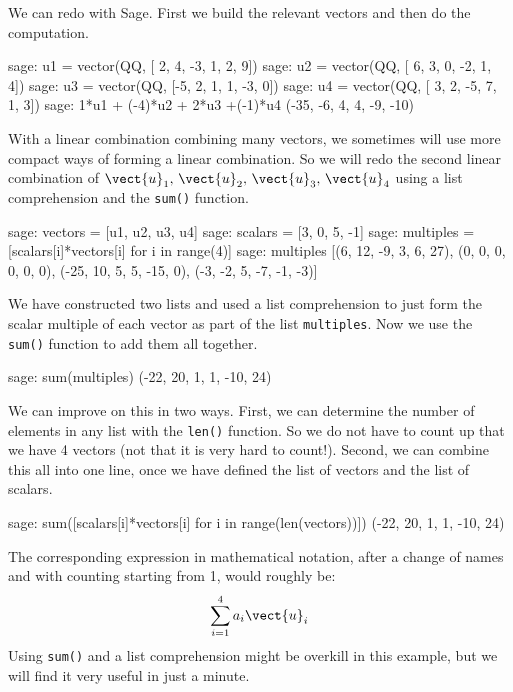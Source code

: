 We can redo  with Sage.  First we build the relevant vectors and then do the computation.
%
\begin{sageexample}
sage: u1 = vector(QQ,  [ 2, 4, -3,  1,  2, 9])
sage: u2 = vector(QQ,  [ 6, 3,  0, -2,  1, 4])
sage: u3 = vector(QQ,  [-5, 2,  1,  1, -3, 0])
sage: u4 = vector(QQ,  [ 3, 2, -5,  7,  1, 3])
sage: 1*u1 + (-4)*u2 + 2*u3 +(-1)*u4
(-35, -6, 4, 4, -9, -10)
\end{sageexample}
%
With a linear combination combining many vectors, we sometimes will use more compact ways of forming a linear combination.  So we will redo the second linear combination of $\vect{u}_1,\,\vect{u}_2,\,\vect{u}_3,\,\vect{u}_4$ using a list comprehension and the \verb?sum()? function.
%
\begin{sageexample}
sage: vectors = [u1, u2, u3, u4]
sage: scalars = [3, 0, 5, -1]
sage: multiples = [scalars[i]*vectors[i] for i in range(4)]
sage: multiples
[(6, 12, -9, 3, 6, 27), (0, 0, 0, 0, 0, 0),
 (-25, 10, 5, 5, -15, 0), (-3, -2, 5, -7, -1, -3)]
\end{sageexample}
%
We have constructed two lists and used a list comprehension to just form the scalar multiple of each vector as part of the list \verb?multiples?.  Now we use the \verb?sum()? function to add them all together.
%
\begin{sageexample}
sage: sum(multiples)
(-22, 20, 1, 1, -10, 24)
\end{sageexample}
%
We can improve on this in two ways.  First, we can determine the number of elements in any list with the \verb?len()? function.  So we do not have to count up that we have 4 vectors (not that it is very hard to count!).  Second, we can combine this all into one line, once we have defined the list of vectors and the list of scalars.
%
\begin{sageexample}
sage: sum([scalars[i]*vectors[i] for i in range(len(vectors))])
(-22, 20, 1, 1, -10, 24)
\end{sageexample}
%
The corresponding expression in mathematical notation, after a change of names and with counting starting from 1, would roughly be:
%
\begin{align*}
\sum_{i=1}^4 a_i\vect{u}_i
\end{align*}
%
Using \verb?sum()? and a list comprehension might be overkill in this example, but we will find it very useful in just a minute.
%
\begin{sageverbatim}
\end{sageverbatim}
%
